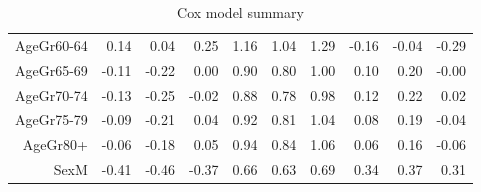 \begin{table}[ht]
\begin{tabular}{rrrrrrrrrr}
  AgeGr60-64 & 0.14 & 0.04 & 0.25 & 1.16 & 1.04 & 1.29 & -0.16 & -0.04 & -0.29 \\ 
  AgeGr65-69 & -0.11 & -0.22 & 0.00 & 0.90 & 0.80 & 1.00 & 0.10 & 0.20 & -0.00 \\ 
  AgeGr70-74 & -0.13 & -0.25 & -0.02 & 0.88 & 0.78 & 0.98 & 0.12 & 0.22 & 0.02 \\ 
  AgeGr75-79 & -0.09 & -0.21 & 0.04 & 0.92 & 0.81 & 1.04 & 0.08 & 0.19 & -0.04 \\ 
  AgeGr80+ & -0.06 & -0.18 & 0.05 & 0.94 & 0.84 & 1.06 & 0.06 & 0.16 & -0.06 \\ 
  SexM & -0.41 & -0.46 & -0.37 & 0.66 & 0.63 & 0.69 & 0.34 & 0.37 & 0.31 \\ 
   \hline
\end{tabular}
\caption{Cox model summary} 
\end{table}
